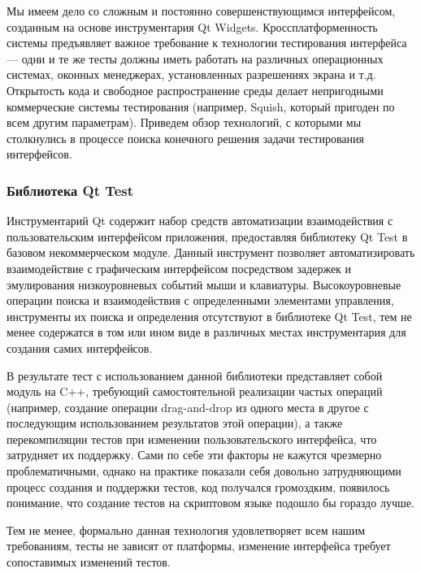 \documentclass[conference]{IEEEtran}
\begin{document}
Мы имеем дело со сложным и постоянно совершенствующимся интерфейсом, созданным на 
основе инструментария Qt Widgets. Кроссплатформенность системы предъявляет важное 
требование к технологии тестирования интерфейса --- одни и те же тесты должны иметь 
работать на различных операционных системах, оконных менеджерах, установленных разрешениях 
экрана и т.д. Открытость кода и свободное распространение среды делает непригодными 
коммерческие системы тестирования (например, Squish, который пригоден по всем другим 
параметрам). Приведем обзор технологий, с которыми мы столкнулись в процессе поиска 
конечного решения задачи тестирования интерфейсов.

\subsubsection{Библиотека Qt Test}
Инструментарий Qt содержит набор средств автоматизации взаимодействия с пользовательским 
интерфейсом приложения, предоставляя библиотеку Qt Test в базовом некоммерческом модуле. 
Данный инструмент позволяет автоматизировать взаимодействие с графическим интерфейсом 
посредством задержек и эмулирования низкоуровневых событий мыши и клавиатуры. Высокоуровневые 
операции поиска и взаимодействия с определенными элементами управления, инструменты 
их поиска и определения отсутствуют в библиотеке Qt Test, тем не менее содержатся 
в том или ином виде в различных местах инструментария для создания самих интерфейсов. 

В результате тест с использованием данной библиотеки представляет собой модуль на 
C++, требующий самостоятельной реализации частых операций (например, создание операции 
drag-and-drop из одного места в другое с последующим использованием результатов этой 
операции), а также перекомпиляции тестов при изменении пользовательского интерфейса, 
что затрудняет их поддержку. Сами по себе эти факторы не кажутся чрезмерно проблематичными, 
однако на практике показали себя довольно затрудняющими процесс создания и поддержки 
тестов, код получался громоздким, появилось понимание, что создание тестов на скриптовом 
языке подошло бы гораздо лучше.

Тем не менее, формально данная технология удовлетворяет всем нашим требованиям, тесты 
не зависят от платформы, изменение интерфейса требует сопоставимых изменений тестов.
\end{document}
